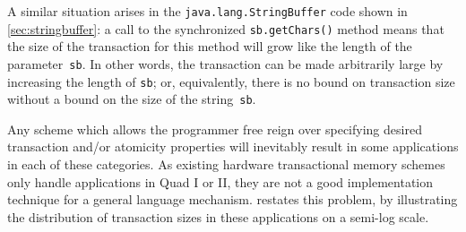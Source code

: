 A similar situation arises in the {\tt java.lang.StringBuffer} code
shown in \ref{sec:stringbuffer}:  a call to the synchronized
\texttt{sb.getChars()} method means that
the size of the transaction for this method will grow like the length
of the parameter~\texttt{sb}.  In other words, the transaction can be
made arbitrarily large by increasing the length of \texttt{sb}; or,
equivalently, there is no bound on transaction size without a bound on
the size of the string~\texttt{sb}.


Any scheme which allows the programmer free reign over specifying
desired transaction and/or atomicity properties will inevitably result
in some applications in each of these categories.  As existing
hardware transactional memory schemes only handle applications in Quad
I or II, they are not a good implementation technique for a general
language mechanism.   restates this problem, by
illustrating the distribution of transaction sizes in these
applications on a semi-log scale.

